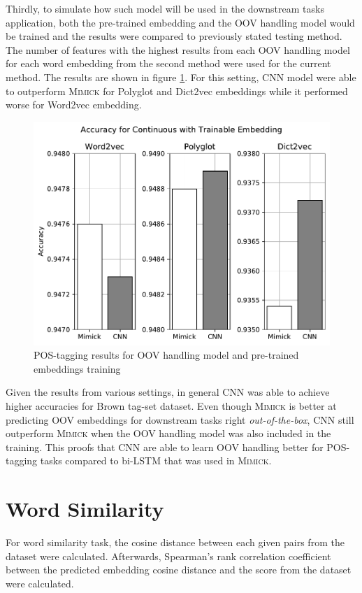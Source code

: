       Thirdly, to simulate how such model will be used in the
      downstream tasks application, both the pre-trained embedding and
      the OOV handling model would be trained and the results were
      compared to previously stated testing method. The number of
      features with the highest results from each OOV handling model
      for each word embedding from the second method were used for the
      current method. The results are shown in figure
      \ref{fig:postag_train_embed_results}. For this setting, CNN
      model were able to outperform \textsc{Mimick} for Polyglot and
      Dict2vec embeddings while it performed worse for Word2vec
      embedding.
      \begin{figure}[H]
        \centering
        \includegraphics[width=0.8\linewidth]{images/train_embed.pdf}
        \caption{POS-tagging results for OOV handling model and pre-trained embeddings training}
        \label{fig:postag_train_embed_results}
      \end{figure}
      
      Given the results from various settings, in general CNN was
      able to achieve higher accuracies for Brown tag-set dataset.
      Even though \textsc{Mimick} is better at predicting OOV
      embeddings for downstream tasks right \textit{out-of-the-box},
      CNN still outperform \textsc{Mimick} when the OOV handling model
      was also included in the training. This proofs that CNN are able
      to learn OOV handling better for POS-tagging tasks compared to
      bi-LSTM that was used in \textsc{Mimick}.

    \section{Word Similarity}
    For word similarity task, the cosine distance between each given
    pairs from the dataset were calculated. Afterwards, Spearman's rank
    correlation coefficient between the predicted embedding cosine
    distance and the score from the dataset were calculated.

